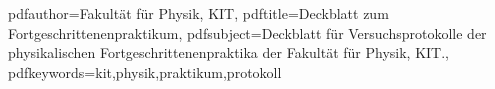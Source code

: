 \documentclass{include/protokollclass}
\begin{document}
    \hypersetup
    {
        pdfauthor={Fakultät für Physik, KIT},
        pdftitle={Deckblatt zum Fortgeschrittenenpraktikum},
        pdfsubject={Deckblatt für Versuchsprotokolle der physikalischen Fortgeschrittenenpraktika der Fakultät für Physik, KIT.},
        pdfkeywords={kit,physik,praktikum,protokoll}
    }
    
    
\end{document}
